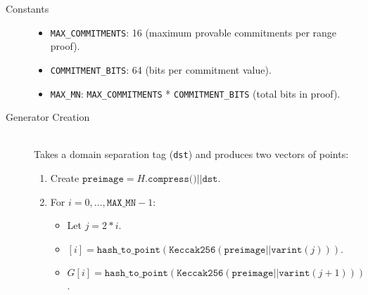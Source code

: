 \documentclass[12pt,a4paper]{article}
\begin{document}
\begin{description}
\item[Constants] \hfill
\begin{itemize}
\item \texttt{MAX\_COMMITMENTS}: 16 (maximum provable commitments per range proof).  %
\item \texttt{COMMITMENT\_BITS}: 64 (bits per commitment value).  %
\item \texttt{MAX\_MN}: \texttt{MAX\_COMMITMENTS} * \texttt{COMMITMENT\_BITS} (total bits in proof).  %
\end{itemize}

\item[Generator Creation] \hfill \\
Takes a domain separation tag (\texttt{dst}) and produces two vectors of points: %
\begin{enumerate}
\item Create $\texttt{preimage} = H\texttt{.compress()} || \texttt{dst}$.  %
\item For $i=0,\ldots,\texttt{MAX\_MN} - 1$: %
  \begin{itemize}
  \item Let $j = 2*i$.  %
  \item $[i] = \texttt{hash\_to\_point}(\texttt{Keccak256}(\texttt{preimage} || \texttt{varint}(j)))$.  %
  \item $G[i] = \texttt{hash\_to\_point}(\texttt{Keccak256}(\texttt{preimage} || \texttt{varint}(j+1)))$.  %
  \end{itemize}
\end{enumerate}


\end{description}
\end{document}
